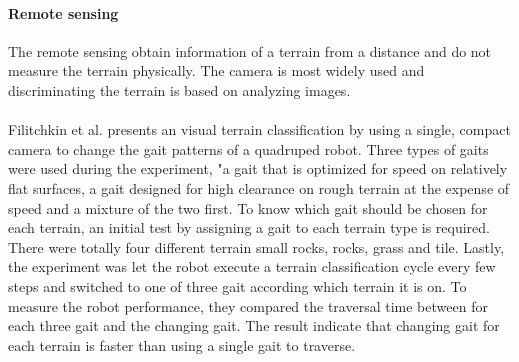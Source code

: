 \documentclass[USenglish]{ifimaster}  %
\begin{document}
\paragraph{Remote sensing}
The remote sensing obtain information of a terrain from a distance and do not measure the terrain physically. The camera is most widely used and discriminating the terrain is based on analyzing images.
\\
\\ 
Filitchkin et al. \cite{littleDog} presents an visual terrain classification by using a single, compact camera to change the gait patterns of a quadruped robot. Three types of gaits were used during the experiment, "a gait that is optimized for speed on relatively flat surfaces, a gait designed for high clearance on rough terrain at the expense of speed and a mixture of the two first. To know which gait should be chosen for each terrain, an initial test by assigning a gait to each terrain type is required. There were totally four different terrain small rocks, rocks, grass and tile. Lastly, the experiment was let the robot execute a terrain classification cycle every few steps and switched to one of three gait according which terrain it is on. To measure the robot performance, they compared the traversal time between for each three gait and the changing gait. The result indicate that changing gait for each terrain is faster than using a single gait to traverse.
\\
\\

\end{document}
